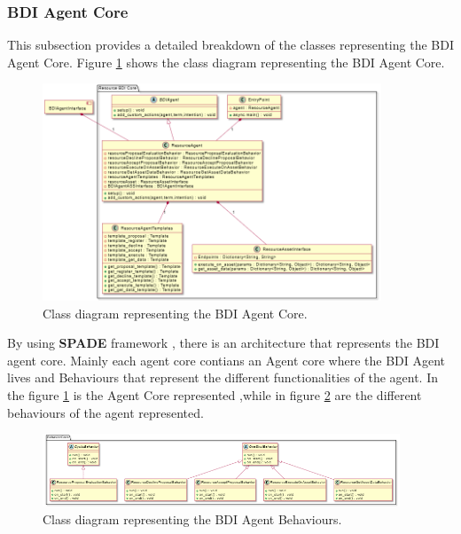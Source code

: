 \newpage
\subsubsection{BDI Agent Core}
This subsection provides a detailed breakdown of the classes representing the BDI Agent Core.
Figure \ref{fig:bdi_agent_core_classes} shows the class diagram representing the BDI Agent Core.
\begin{figure}[ht]
    \centering
    \includegraphics[width=0.9\textwidth]{Images/Classes_Resource/BDI_Core/Agent_core.png}
    \caption{Class diagram representing the BDI Agent Core.}
    \label{fig:bdi_agent_core_classes}
\end{figure}

By using \textbf{SPADE} framework , there is an architecture that represents the BDI agent core.
Mainly each agent core contians an Agent core where the BDI Agent lives and Behaviours that represent the different functionalities of the agent.
In the figure \ref{fig:bdi_agent_core_classes} is the Agent Core represented ,while in figure \ref{fig:bdi_agent_behaviours_classes} are the different behaviours of the agent represented.
\begin{figure}[ht]
    \centering
    \includegraphics[width=0.95\textwidth]{Images/Classes_Resource/BDI_Core/Behaviours.png}
    \caption{Class diagram representing the BDI Agent Behaviours.}
    \label{fig:bdi_agent_behaviours_classes}
\end{figure}

